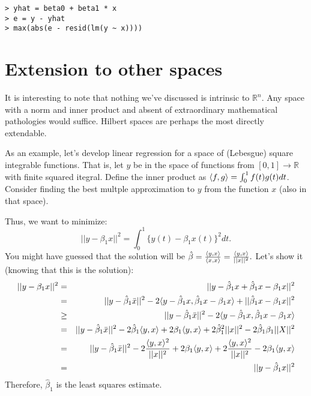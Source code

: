 \begin{verbatim}
> yhat = beta0 + beta1 * x 
> e = y - yhat
> max(abs(e - resid(lm(y ~ x))))
\end{verbatim}


\section{Extension to other spaces}

It is interesting to note that nothing we've discussed is intrinsic
to $\mathbb{R}^n$. Any space with a norm and inner product and
absent of extraordinary mathematical pathologies would suffice.  Hilbert spaces are perhaps the most directly extendable. 

As an example, let's develop linear regression for
a space of (Lebesgue) square integrable functions. That is, let $y$ be in the space
of functions from $[0,1] \rightarrow \mathbb{R}$ with finite squared itegral.
Define the inner product as $\langle f, g \rangle = \int_0^1 f(t)g(t)dt$. Consider
finding the best multple approximation to $y$ from the function $x$ (also in that space). 

Thus, we want to minimize:
$$
|| y - \beta_1 x ||^2 = 
\int_0^1 \{y(t) - \beta_1 x(t)\}^2 dt.
$$
You might have guessed that the solution will be $\hat \beta = \frac{\langle y, x \rangle}{\langle x, x \rangle} = \frac{\langle y, x \rangle}{||x||^2}.$
Let's show it (knowing that this is the solution):
\begin{eqnarray*}
|| y - \beta_1 x ||^2 & = & 
|| y - \hat \beta_1 x + \hat \beta_1 x  - \beta_1 x ||^2 \\
& = & || y - \hat \beta_1 \bar x ||^2
- 2 \ip{ y - \hat \beta_1 x }{\hat \beta_1 x - \beta_1 x}
+ ||\hat \beta_1 x - \beta_1 x||^2 \\
& \geq & 
|| y - \hat \beta_1 \bar x ||^2
- 2 \ip{ y - \hat \beta_1 x}{\hat \beta_1 x - \beta_1 x}\\
& = & || y - \hat \beta_1 \bar x ||^2
- 2 \hat \beta_1 \ip{y}{x} + 2 \beta_1 \ip{y}{x} + 2
\hat \beta_1^2 ||x||^2 - 2 \hat \beta_1 \beta_1 ||X||^2 \\
& = & || y - \hat \beta_1 \bar x ||^2 %
-  2 \frac{\ip{y}{x}^2}{||x||^2} + 2 \beta_1 \ip{y}{x} %
+ 2 \frac{\ip{y}{x}^2}{||x||^2} %
- 2 \beta_1 \ip{y}{x} \\
& = & || y - \hat \beta_1  x ||^2
\end{eqnarray*}
Therefore, $\hat \beta_1$ is the least squares estimate.

